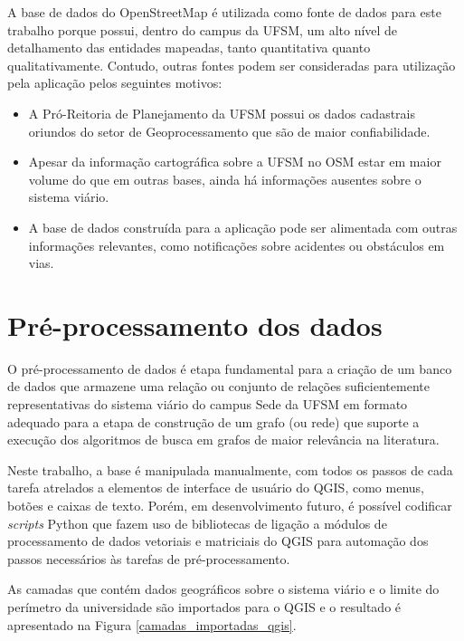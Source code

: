 \documentclass[oneside,openright,12pt]{ufsm_2015} %
\begin{document}
A base de dados do OpenStreetMap é utilizada como fonte de dados para este trabalho porque possui, dentro do campus da UFSM, um alto nível de detalhamento das entidades mapeadas, tanto quantitativa quanto qualitativamente. 
Contudo, outras fontes podem ser consideradas para utilização pela aplicação pelos seguintes motivos:
\begin{itemize}
    \item A Pró-Reitoria de Planejamento da UFSM possui os dados cadastrais oriundos do setor de Geoprocessamento que são de maior confiabilidade.
    \item Apesar da informação cartográfica sobre a UFSM no OSM estar em maior volume do que em outras bases, ainda há informações ausentes sobre o sistema viário.
    \item A base de dados construída para a aplicação pode ser alimentada com outras informações relevantes, como notificações sobre acidentes ou obstáculos em vias.
\end{itemize}
    
    
    
\section{Pré-processamento dos dados}

O pré-processamento de dados é etapa fundamental para a criação de um banco de dados que armazene uma relação ou conjunto de relações suficientemente representativas do sistema viário do campus Sede da UFSM em formato adequado para a etapa de construção de um grafo (ou rede) que suporte a execução dos algoritmos de busca em grafos de maior relevância na literatura.

Neste trabalho, a base é manipulada manualmente, com todos os passos de cada tarefa atrelados a elementos de interface de usuário do QGIS, como menus, botões e caixas de texto. 
Porém, em desenvolvimento futuro, é possível codificar \textit{scripts} Python que fazem uso de bibliotecas de ligação a módulos de processamento de dados vetoriais e matriciais do QGIS para automação dos passos necessários às tarefas de pré-processamento.

As camadas que contém dados geográficos sobre o sistema viário e o limite do perímetro da universidade são importados para o QGIS e o resultado é apresentado na Figura \ref{camadas_importadas_qgis}.
\end{document}
